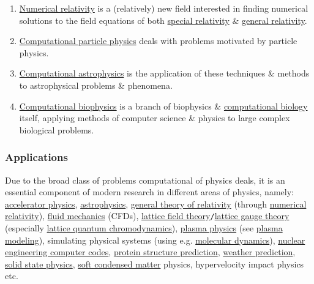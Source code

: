 \documentclass{article}
\begin{document}
\begin{enumerate}
	\item \href{https://en.wikipedia.org/wiki/Numerical_relativity}{Numerical relativity} is a (relatively) new field interested in finding numerical solutions to the field equations of both \href{https://en.wikipedia.org/wiki/Special_relativity}{special relativity} \& \href{https://en.wikipedia.org/wiki/General_relativity}{general relativity}.
	\item \href{https://en.wikipedia.org/wiki/Computational_particle_physics}{Computational particle physics} deals with problems motivated by particle physics.
	\item \href{https://en.wikipedia.org/wiki/Computational_astrophysics}{Computational astrophysics} is the application of these techniques \& methods to astrophysical problems \& phenomena.
	\item \href{https://en.wikipedia.org/wiki/Computational_biophysics}{Computational biophysics} is a branch of biophysics \& \href{https://en.wikipedia.org/wiki/Computational_biology}{computational biology} itself, applying methods of computer science \& physics to large complex biological problems.
\end{enumerate}

\subsubsection{Applications}
Due to the broad class of problems computational of physics deals, it is an essential component of modern research in different areas of physics, namely: \href{https://en.wikipedia.org/wiki/Accelerator_physics}{accelerator physics}, \href{https://en.wikipedia.org/wiki/Astrophysics}{astrophysics}, \href{https://en.wikipedia.org/wiki/General_theory_of_relativity}{general theory of relativity} (through \href{https://en.wikipedia.org/wiki/Numerical_relativity}{numerical relativity}), \href{https://en.wikipedia.org/wiki/Fluid_mechanics}{fluid mechanics} (CFDs), \href{https://en.wikipedia.org/wiki/Lattice_field_theory}{lattice field theory}{\tt/}\href{https://en.wikipedia.org/wiki/Lattice_gauge_theory}{lattice gauge theory} (especially \href{https://en.wikipedia.org/wiki/Lattice_QCD}{lattice quantum chromodynamics}), \href{https://en.wikipedia.org/wiki/Plasma_physics}{plasma physics} (see \href{https://en.wikipedia.org/wiki/Plasma_modeling}{plasma modeling}), simulating physical systems (using e.g. \href{https://en.wikipedia.org/wiki/Molecular_dynamics}{molecular dynamics}), \href{https://en.wikipedia.org/wiki/Nuclear_engineering_computer_codes}{nuclear engineering computer codes}, \href{https://en.wikipedia.org/wiki/Protein_structure_prediction}{protein structure prediction}, \href{https://en.wikipedia.org/wiki/Weather_prediction}{weather prediction}, \href{https://en.wikipedia.org/wiki/Solid_state_physics}{solid state physics}, \href{https://en.wikipedia.org/wiki/Soft_condensed_matter}{soft condensed matter} physics, hypervelocity impact physics etc.
\end{document}
